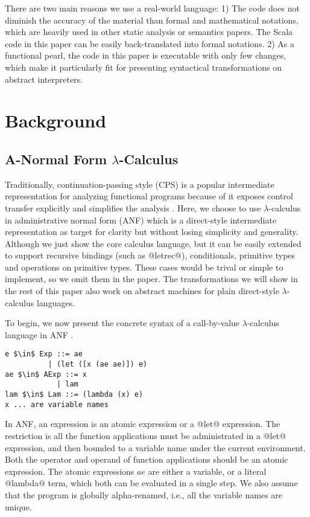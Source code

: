 \documentclass[acmsmall,review,anonymous]{acmart}\settopmatter{printfolios=true,printccs=false,printacmref=false}
\begin{document}
There are two main reasons we use a real-world language:
1) The code does not diminish the accuracy of the material
than formal and mathematical notations, 
which are heavily used in other static analysis or semantics papers.
The Scala code in this paper can be easily back-translated into formal notations.
2) As a functional pearl, the code in this paper is executable with only few changes, 
which make it particularly fit for presenting syntactical transformations on abstract
interpreters.

\section{Background} \label{background}

\subsection{A-Normal Form $\lambda$-Calculus} \label{anfsyntax}

Traditionally, continuation-passing style (CPS) is a popular intermediate representation
for analyzing functional programs because of it exposes control transfer explicitly
and simplifies the analysis \cite{Shivers:1991:SSC:115865.115884, Shivers:1988:CFA:53990.54007}.
Here, we choose to use $\lambda$-calculus in administrative normal form (ANF) 
which is a direct-style intermediate representation as target for clarity 
but without losing simplicity and generality.
Although we just show the core calculus language, but it can be easily extended
to support recursive bindings (such as @letrec@), conditionals, primitive types and 
operations on primitive types. These cases would be trival or simple to implement, 
so we omit them in the paper.
The transformations we will show in the rest of this paper
also work on abstract machines for plain direct-style $\lambda$-calculus languages.

To begin, we now present the concrete syntax of a call-by-value $\lambda$-calculus language 
in ANF \cite{flanagan1993essence}.

\begin{lstlisting}
e $\in$ Exp ::= ae
          | (let ([x (ae ae)]) e)
ae $\in$ AExp ::= x            
            | lam
lam $\in$ Lam ::= (lambda (x) e)
x ... are variable names
\end{lstlisting}

In ANF, an expression is an atomic expression or a @let@ expression.
The restriction is all the function applications must be administrated in a @let@ expression,
and then bounded to a variable name under the current environment.
Both the operator and operand of function applications should be an atomic expression.
The atomic expressions $ae$ are either a variable, or a literal @lambda@ term, which
both can be evaluated in a single step.
We also assume that the program is globally alpha-renamed, i.e., all the
variable names are unique.
\end{document}
